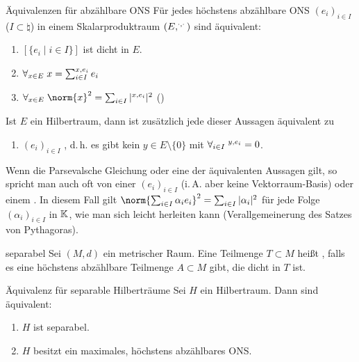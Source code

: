 \begin{Satz}{Äquivalenzen für abzählbare ONS}
    Für jedes höchstens abzählbare ONS $(e_i)_{i \in I}$ ($I \subset \natural$)
    in einem Skalarproduktraum $(E, \sp{\cdot, \cdot})$ sind äquivalent:
    \begin{enumerate}
        \item
        $[\{e_i \;|\; i \in I\}]$ ist dicht in $E$.
        
        \item
        $\forall_{x \in E}\; x = \sum_{i \in I} \sp{x, e_i} e_i$
        
        \item
        $\forall_{x \in E}\; \norm{x}^2 = \sum_{i \in I} |\sp{x, e_i}|^2$
        ()
    \end{enumerate}
    Ist $E$ ein Hilbertraum, dann ist zusätzlich jede dieser Aussagen äquivalent zu
    \begin{enumerate}[start=4]
        \item
        $(e_i)_{i \in I}$ , d.\,h. es gibt kein $y \in E \setminus \{0\}$ mit
        $\forall_{i \in I}\; \sp{y, e_i} = 0$.
    \end{enumerate}
\end{Satz}

\begin{Bem}
    Wenn die Parsevalsche Gleichung oder eine der äquivalenten Aussagen gilt,
    so spricht man auch oft von einer
     $(e_i)_{i \in I}$
    (i.\,A. aber keine Vektorraum-Basis)
    oder einem .
    In diesem Fall gilt
    $\norm{\sum_{i \in I} \alpha_i e_i}^2 = \sum_{i \in I} |\alpha_i|^2$
    für jede Folge $(\alpha_i)_{i \in I}$ in $\mathbb{K}$, wie man sich leicht herleiten kann
    (Verallgemeinerung des Satzes von Pythagoras).
\end{Bem}

\linie

\begin{Def}{separabel}
    Sei $(M, d)$ ein metrischer Raum.
    Eine Teilmenge $T \subset M$ heißt , falls es eine höchstens abzählbare
    Teilmenge $A \subset M$ gibt, die dicht in $T$ ist.
\end{Def}

\begin{Satz}{Äquivalenz für separable Hilberträume}
    Sei $H$ ein Hilbertraum. Dann sind äquivalent:
    \begin{enumerate}
        \item
        $H$ ist separabel.
        
        \item
        $H$ besitzt ein maximales, höchstens abzählbares ONS.
    \end{enumerate}
\end{Satz}

